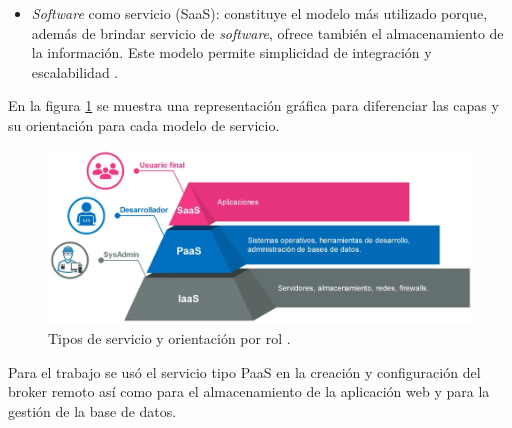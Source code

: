 \begin{itemize}
\item \emph{Software} como servicio (SaaS): constituye el modelo más utilizado porque, además de brindar servicio de \emph{software}, ofrece también el almacenamiento de la información. Este modelo permite simplicidad de integración y escalabilidad \citep{BOOK:2}. 




\end{itemize}

En la figura \ref{fig:servicios} se muestra una representación gráfica para diferenciar las capas y su orientación para cada modelo de servicio.




\begin{figure}[htbp]
	\centering
	\includegraphics[width=.9\textwidth]{./Figures/servicios.png}
	\caption{Tipos de servicio y orientación por rol \protect\footnotemark.}

	\label{fig:servicios}
\end{figure}



Para el trabajo se usó el servicio tipo PaaS en la creación y configuración del broker remoto así como para el almacenamiento de la aplicación web y para la gestión de la base de datos.



